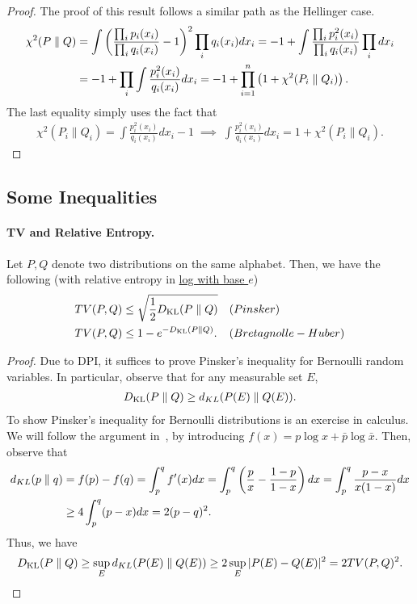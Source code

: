 \documentclass[12pt]{article}
\begin{document}
	\begin{proof} The proof of this result follows a similar path as the Hellinger case. 
		\begin{align}
			\chi^2(P \parallel Q) &= \int \left( \frac{\prod_i p_i(x_i)}{ \prod_i q_i(x_i)} -1 \right)^2 \prod_i q_i(x_i) dx_i = -1 + \int \frac{\prod_i p_i^2(x_i)}{\prod_i q_i(x_i)} \prod_i dx_i \\
			& = -1 + \prod_i \int \frac{p_i^2(x_i)}{q_i(x_i)} dx_i = -1 + \prod_{i=1}^n \left( 1 + \chi^2(P_i \parallel Q_i) \right). 
		\end{align} 
		The last equality simply uses the fact that 
		\begin{align}
		\chi^2(P_i \parallel Q_i) = \int \frac{p_i^2(x_i)}{q_i(x_i)} dx_i - 1 \; \implies \; \int \frac{p_i^2(x_i)}{q_i(x_i)} dx_i  = 1 + \chi^2(P_i \parallel Q_i). 
		\end{align}	
	\end{proof}






\subsection{Some Inequalities}
\label{subsec:some-inequalities}

\paragraph{TV and Relative Entropy.}
Let $P, Q$ denote two distributions on the same alphabet. Then, we have the following 	(with relative entropy in \underline{log with base $e$})
\begin{align}
	& TV(P, Q) \leq \sqrt{\frac{1}{2}D_{\text{KL}}(P \parallel Q)} &&  (Pinsker) \\
	&TV(P, Q)  \leq 1 - e^{-D_{\text{KL}}(P \parallel Q)}. && (Bretagnolle-Huber) 
\end{align}
\begin{proof}
Due to DPI, it suffices to prove Pinsker's inequality for Bernoulli random variables. In particular, observe that for any measurable set $E$, 
\begin{align}
D_{\text{KL}}(P \parallel Q) \geq d_{KL}(P(E) \parallel Q(E)). 
\end{align}
To show Pinsker's inequality for Bernoulli distributions is an exercise in calculus. We will follow the argument in~\cite{canonne2022short}, by introducing $f(x) = p \log x + \bar{p} \log \bar{x}$. Then, observe that 
\begin{align}
d_{KL}(p \parallel q) &= f(p)-f(q) = \int_p^q f'(x)dx = \int_p^q \left( \frac{p}{x} - \frac{1-p}{1-x} \right) dx = \int_{p}^q \frac{p-x}{x(1-x)} dx \\
& \geq 4 \int_p^q (p-x)dx = 2 (p-q)^2. 
\end{align}
Thus, we have 
\begin{align}
D_{\text{KL}}(P \parallel Q) \geq \sup_{E} d_{KL}(P(E) \parallel Q(E)) \geq 2 \sup_{E} |P(E) - Q(E)|^2 = 2TV(P, Q)^2. 
\end{align}
\end{proof}
\end{document}
